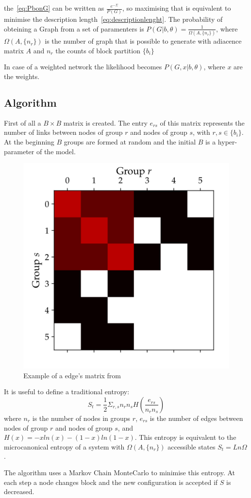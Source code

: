 the~\ref{eq:PbonG} can be written as $\frac{e^{-\Sigma}}{P(G)}$, so maximising
that is equivalent to minimise the description
length~\ref{eq:descriptionlenght}.
The probability of obteining a Graph from a set of paramenters is
$P(G|b,\theta)=\frac{1}{\Omega(A,\{n_r\})}$, where $\Omega(A,\{n_r\})$ is the
number of graph that is possible to generate with adiacence matrix $A$ and $n_r$
the counts of block partition $\{b_i\}$

In case of a weighted network the likelihood becomes $P(G,x|b,\theta)$, where $x$
are the weights.

\subsection{Algorithm}
First of all a $B\times B$ matrix is created. The entry $e_{rs}$ of this matrix
represents the number of links between nodes of group $r$ and nodes of group $s$,
with $r,s\in\{b_i\}$. At the beginning $B$ groups are formed at random and the initial $B$ is a hyper-parameter of the model.

\begin{figure}
  \centering
  \includegraphics[width=0.3\linewidth]{pictures/topic/topic__pixioto_ers.pdf}
  \caption{Example of a edge's matrix from~\cite{peixoto_graph-tool_2014}}
    \label{fig:hsbm-ers}
\end{figure}

It is useful to define a traditional entropy:
\begin{equation}\label{eq:hSBMentropyt}
  S_t=\frac{1}{2}\Sigma_{r,s} n_rn_sH\left(\frac{e_{rs}}{n_rn_s}\right)
\end{equation}
where $n_{r}$ is the number of nodes in groups $r$, $e_{rs}$ is the
number of edges between nodes of group $r$ and nodes of group $s$, and
$H(x)=-xln(x)-(1-x)ln(1-x)$. This entropy is equivalent to the microcanonical
entropy of a system with ${\Omega(A,\{n_r\})}$ accessible states $S_t=Ln\Omega$.

The algorithm uses a Markov Chain MonteCarlo to minimise this entropy.
At each step a node changes block and the new configuration is accepted if $S$ is decreased.

